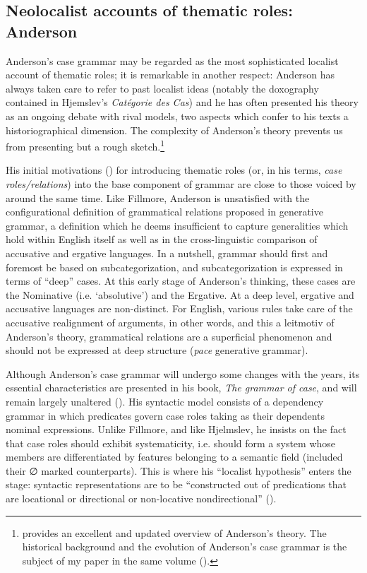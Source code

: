 \documentclass[english,output=paper,colorlinks,citecolor=brown]{../langscibook}
\begin{document}
\subsection{Neolocalist accounts of thematic roles: Anderson}\largerpage

Anderson’s case grammar may be regarded as the most sophisticated localist account of thematic roles; it is remarkable in another respect: Anderson has always taken care to refer to past localist ideas (notably the doxography contained in Hjemslev’s \textit{Catégorie des Cas}) and he has often presented his theory as an ongoing debate with rival models, two aspects which confer to his texts a historiographical dimension. The complexity of Anderson’s theory prevents us from presenting but a rough sketch.{\footnote{\citet{Andor2018} provides an excellent and updated overview of Anderson’s theory. The historical background and the evolution of Anderson’s case grammar is the subject of my paper in the same volume (\citealt{Fortis2018Anderson}).}}

His initial motivations (\citealt{Anderson1968}) for introducing thematic roles (or, in his terms, \textit{case roles\slash relations}) into the base component of grammar are close to those voiced by \citet{Fillmore1966, Fillmore1968} around the same time. Like Fillmore, Anderson is unsatisfied with the configurational definition of grammatical relations proposed in generative grammar, a definition which he deems insufficient to capture generalities which hold within English itself as well as in the cross-linguistic comparison of accusative and ergative languages. In a nutshell, grammar should first and foremost be based on subcategorization, and subcategorization is expressed in terms of “deep” cases. At this early stage of Anderson’s thinking, these cases are the Nominative (i.e. ‘absolutive’) and the Ergative. At a deep level, ergative and accusative languages are non-distinct. For English, various rules take care of the accusative realignment of arguments, in other words, and this a leitmotiv of Anderson’s theory, grammatical relations are a superficial phenomenon and should not be expressed at deep structure (\textit{pace} generative grammar).

Although Anderson’s case grammar will undergo some changes with the years, its essential characteristics are presented in his \citeyear{Anderson1971} book, \textit{The grammar of case}, and will remain largely unaltered (\citealt{Fortis2018Anderson}). His syntactic model consists of a dependency grammar in which predicates govern case roles taking as their dependents nominal expressions. Unlike Fillmore, and like Hjelmslev, he insists on the fact that case roles should exhibit systematicity, i.e. should form a system whose members are differentiated by features belonging to a semantic field (included their ∅ marked counterparts). This is where his “localist hypothesis” enters the stage: syntactic representations are to be “constructed out of predications that are locational or directional or non-locative nondirectional” (\citealt[10]{Anderson1973}).
\end{document}
